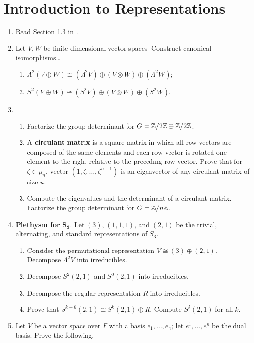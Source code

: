 \documentclass[../psets.tex]{subfiles}
\begin{document}
\section{Introduction to Representations}
\begin{enumerate}
    \item {}Read Section 1.3 in \textcite{bib:FultonHarris}.
    \item Let $V,W$ be finite-dimensional vector spaces. Construct canonical isomorphisms\dots
    \begin{enumerate}
        \item $\Lambda^2(V\oplus W)\cong(\Lambda^2V)\oplus(V\otimes W)\oplus(\Lambda^2W)$;
        \item $S^2(V\oplus W)\cong(S^2V)\oplus(V\otimes W)\oplus(S^2W)$.
    \end{enumerate}
    \item 
    \begin{enumerate}
        \item Factorize the group determinant for $G=\mathbb{Z}/2\mathbb{Z}\oplus\mathbb{Z}/2\mathbb{Z}$.
        \item A \textbf{circulant matrix} is a square matrix in which all row vectors are composed of the same elements and each row vector is rotated one element to the right relative to the preceding row vector. Prove that for $\zeta\in\mu_n$, vector $(1,\zeta,\dots,\zeta^{n-1})$ is an eigenvector of any circulant matrix of size $n$.
        \item Compute the eigenvalues and the determinant of a circulant matrix. Factorize the group determinant for $G=\mathbb{Z}/n\mathbb{Z}$.
    \end{enumerate}
    \item \textbf{Plethysm for $\bm{S_3}$}. Let $(3)$, $(1,1,1)$, and $(2,1)$ be the trivial, alternating, and standard representations of $S_3$.
    \begin{enumerate}
        \item Consider the permutational representation $V\cong(3)\oplus(2,1)$. Decompose $\Lambda^2V$ into irreducibles.
        \item Decompose $S^2(2,1)$ and $S^3(2,1)$ into irreducibles.
        \item Decompose the regular representation $R$ into irreducibles.
        \item Prove that $S^{k+6}(2,1)\cong S^k(2,1)\oplus R$. Compute $S^k(2,1)$ for all $k$.
    \end{enumerate}
    \item Let $V$ be a vector space over $F$ with a basis $e_1,\dots,e_n$; let $e^1,\dots,e^n$ be the dual basis. Prove the following.

\end{enumerate}
\end{document}
